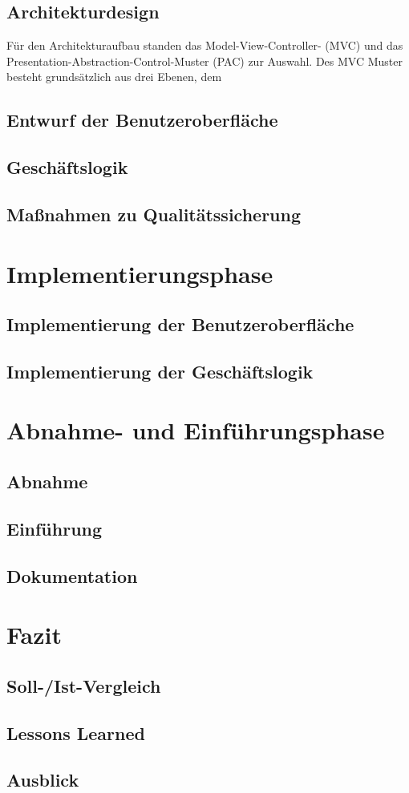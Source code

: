 \section{Architekturdesign}
Für den Architekturaufbau standen das Model-View-Controller- (MVC) und das Presentation-Abstraction-Control-Muster (PAC) zur Auswahl.
Des MVC Muster besteht grundsätzlich aus drei Ebenen, dem  

\section{Entwurf der Benutzeroberfläche}

\section{Geschäftslogik}
\section{Maßnahmen zu Qualitätssicherung}

\chapter{Implementierungsphase}
\section{Implementierung der Benutzeroberfläche}
\section{Implementierung der Geschäftslogik}

\chapter{Abnahme- und Einführungsphase}

\section{Abnahme}
\section{Einführung}
\section{Dokumentation}

\chapter{Fazit}
\section{Soll-/Ist-Vergleich}
\section{Lessons Learned}
\section{Ausblick}
